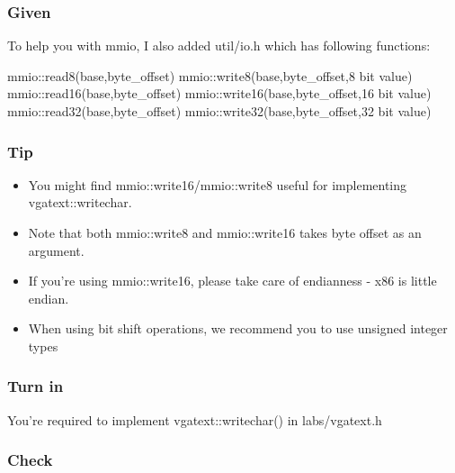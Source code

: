 \documentclass[]{book}
\newenvironment{Shaded}{}{}
\newcommand{\DecValTok}[1]{\textcolor[rgb]{0.00,0.00,1.00}{{#1}}}
\newcommand{\NormalTok}[1]{{#1}}
\begin{document}
\subsubsection*{Given}\label{given}

To help you with mmio, I also added util/io.h which has following
functions:

\begin{Shaded}
\begin{Highlighting}[]
       \NormalTok{mmio::read8(base,byte_offset)}
       \NormalTok{mmio::write8(base,byte_offset,}\DecValTok{8} \NormalTok{bit value)}
       \NormalTok{mmio::read16(base,byte_offset)}
       \NormalTok{mmio::write16(base,byte_offset,}\DecValTok{16} \NormalTok{bit value)}
       \NormalTok{mmio::read32(base,byte_offset)}
       \NormalTok{mmio::write32(base,byte_offset,}\DecValTok{32} \NormalTok{bit value)}
\end{Highlighting}
\end{Shaded}

\subsubsection*{Tip}\label{tip}

\begin{itemize}
\itemsep1pt\parskip0pt
\item
  You might find mmio::write16/mmio::write8 useful for implementing
  vgatext::writechar.
\item
  Note that both mmio::write8 and mmio::write16 takes byte offset as an
  argument.
\item
  If you're using mmio::write16, please take care of endianness - x86 is
  little endian.
\item
  When using bit shift operations, we recommend you to use unsigned
  integer types
\end{itemize}

\subsubsection*{Turn in}\label{turn-in}

You're required to implement vgatext::writechar() in labs/vgatext.h

\subsubsection*{Check}\label{check}
\end{document}
